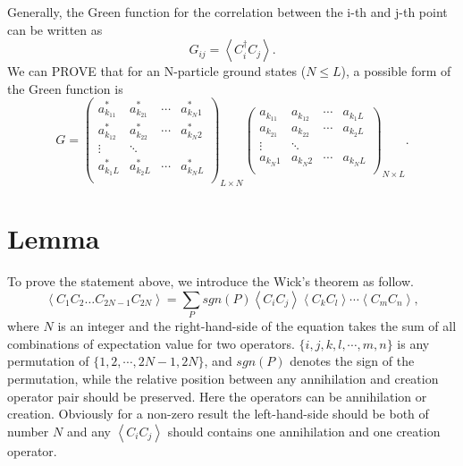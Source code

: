 \documentclass[prb,superscriptaddress,letter,10pt,onecolumn]{revtex4}
\begin{document}
Generally, the Green function for the correlation between the i-th and j-th point can be written as
\begin{equation}
	G_{ij} = \left< C_i^\dagger C_j \right>.
\end{equation}
We can PROVE that for an N-particle ground states ($N\le L$), a possible form of the Green function is
\begin{equation}
	G = 
	\left(                 	
	\begin{array}{cccc}   		
		a_{k_11}^* & a_{k_21}^* & \cdots & a_{k_N1}^*\\  		
		a_{k_12}^* & a_{k_22}^* & \cdots & a_{k_N2}^*\\
		\vdots & \ddots &  & \\
		a_{k_1L}^* & a_{k_2L}^* & \cdots & a_{k_NL}^*\\  		
	\end{array}	
	\right)_{L\times N}
	\left( 
	\begin{array}{cccc}   		
		a_{k_11} & a_{k_12} & \cdots & a_{k_1L}\\  		
		a_{k_21} & a_{k_22} & \cdots & a_{k_2L}\\
		\vdots & \ddots &  & \\
		a_{k_N1} & a_{k_N2} & \cdots & a_{k_NL}\\  		
	\end{array}	
	\right)_{N\times L}.
\end{equation}

\section{Lemma}

To prove the statement above, we introduce the Wick's theorem as follow.
\begin{equation}
	\left< C_1C_2\dots C_{2N-1}C_{2N} \right> = \sum_{P} sgn(P)\left< C_iC_j\right>\left< C_kC_l\right>\cdots\left< C_mC_n\right>,
\end{equation}
where $N$ is an integer and the right-hand-side of the equation takes the sum of all combinations of expectation value for two operators. $\{i,j,k,l,\cdots,m,n\}$ is any permutation of $\{1,2,\cdots,2N-1,2N\}$, and $sgn(P)$ denotes the sign of the permutation, while the relative position between any annihilation and creation operator pair should be preserved.
Here the operators can be annihilation or creation.
Obviously for a non-zero result the left-hand-side should be both of number $N$ and any $\left< C_iC_j\right>$ should contains one annihilation and one creation operator.
\end{document}
